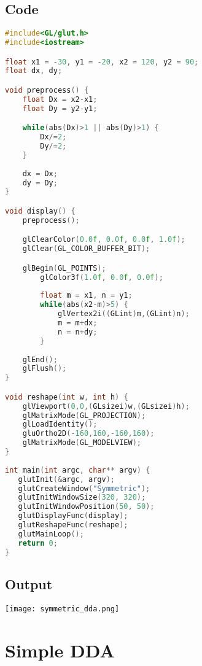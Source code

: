 \documentclass[a4paper, 11pt]{article}
\begin{document}
\subsection*{Code}
\begin{lstlisting}[language=C++]
#include<GL/glut.h>
#include<iostream>

float x1 = -30, y1 = -20, x2 = 120, y2 = 90;
float dx, dy;

void preprocess() {
    float Dx = x2-x1;
    float Dy = y2-y1;

    while(abs(Dx)>1 || abs(Dy)>1) {
        Dx/=2;
        Dy/=2;
    }
    
    dx = Dx;
    dy = Dy;
}

void display() {
    preprocess();

    glClearColor(0.0f, 0.0f, 0.0f, 1.0f);
    glClear(GL_COLOR_BUFFER_BIT);

    glBegin(GL_POINTS);
        glColor3f(1.0f, 0.0f, 0.0f);
        
        float m = x1, n = y1;
        while(abs(x2-m)>5) {
            glVertex2i((GLint)m,(GLint)n);
            m = m+dx;
            n = n+dy;
        }
        
    glEnd();
    glFlush();
}

void reshape(int w, int h) {
    glViewport(0,0,(GLsizei)w,(GLsizei)h);
    glMatrixMode(GL_PROJECTION);
    glLoadIdentity();
    gluOrtho2D(-160,160,-160,160);
    glMatrixMode(GL_MODELVIEW);
}
 
int main(int argc, char** argv) {
   glutInit(&argc, argv);
   glutCreateWindow("Symmetric");
   glutInitWindowSize(320, 320);
   glutInitWindowPosition(50, 50);
   glutDisplayFunc(display);
   glutReshapeFunc(reshape);
   glutMainLoop();
   return 0;
}
\end{lstlisting}

\subsection*{Output}
\begin{center}
\texttt{[image: symmetric\_dda.png]}
\end{center}

\section*{Simple DDA}
\end{document}
